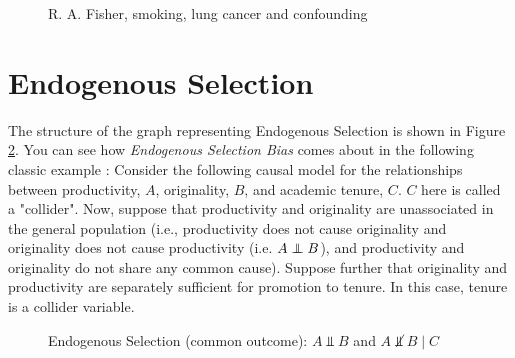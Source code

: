 \documentclass[11pt, oneside]{article}   	%
\newcommand\independent{\protect\mathpalette{\protect\independenT}{\perp}}
\def\independenT#1#2{\mathrel{\rlap{$#1#2$}\mkern2mu{#1#2}}}
\begin{document}
 
 
\begin{figure}[b]
\caption{R. A. Fisher, smoking, lung cancer and confounding}
\label{fig:fisher}
\end{figure}

\section{Endogenous Selection}

The structure of the graph representing Endogenous Selection is shown in Figure \ref{fig:collider}.  You can see how \emph{Endogenous Selection Bias}
comes about in the following classic example \cite{doi:10.1146/annurev-soc-071913-043455}:  Consider the following causal model for the 
relationships between productivity, $A$, originality, $B$, 
and academic tenure, $C$. $C$ here is called a "collider". 
Now, suppose that productivity and originality are unassociated in the general population (i.e., productivity does not cause originality and originality does 
not cause productivity (i.e. $A \independent B$), and productivity and originality do not share any common cause). 
Suppose further that originality and productivity are separately sufficient for promotion to tenure.  In this case, tenure is a collider variable. 


\begin{figure}
\caption{Endogenous Selection (common outcome): $A \Vbar B$ and $A \not \Vbar B \mid C$}
\label{fig:collider}
\end{figure}
\end{document}
